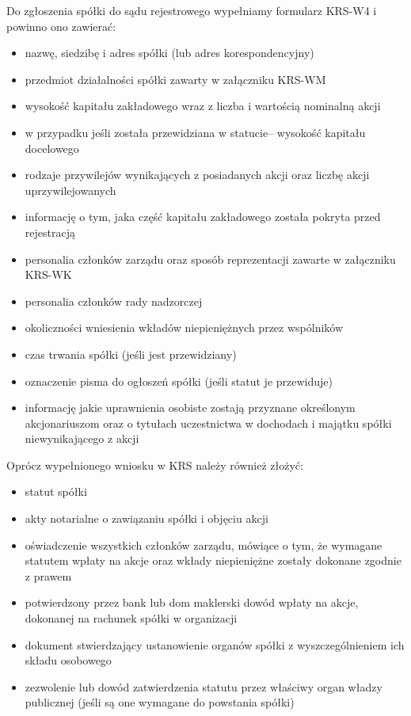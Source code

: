 \documentclass[11pt]{article}
\begin{document}
Do zgłoszenia spółki do sądu rejestrowego wypełniamy formularz KRS-W4 i powinno ono zawierać:
	\begin{itemize}
	
	\item nazwę, siedzibę i adres spółki (lub adres korespondencyjny)
	\item przedmiot działalności spółki zawarty w załączniku KRS-WM
	\item wysokość kapitału zakładowego wraz z liczba i wartością nominalną akcji
	\item w przypadku jeśli została przewidziana w statucie– wysokość kapitału docelowego
	\item rodzaje przywilejów wynikających z posiadanych akcji oraz liczbę akcji uprzywilejowanych
	\item informację o tym, jaka część kapitału zakładowego została pokryta przed rejestracją 
	\item personalia członków zarządu oraz sposób reprezentacji zawarte w załączniku KRS-WK
	\item personalia członków rady nadzorczej
	\item okoliczności wniesienia wkładów niepieniężnych przez wspólników
	\item czas trwania spółki (jeśli jest przewidziany)
	\item oznaczenie pisma do ogłoszeń spółki (jeśli statut je przewiduje)
	\item informację jakie uprawnienia osobiste zostają przyznane określonym akcjonariuszom oraz o tytułach uczestnictwa w dochodach i majątku spółki niewynikającego z akcji

	\end{itemize}
	
	Oprócz wypełnionego wniosku w KRS należy również złożyć:
	
	\begin{itemize}
	
	\item statut spółki
	\item akty notarialne o zawiązaniu spółki i objęciu akcji
	\item oświadczenie wszystkich członków zarządu, mówiące o tym, że wymagane statutem wpłaty na akcje oraz wkłady niepieniężne zostały dokonane zgodnie z prawem
	\item potwierdzony przez bank lub dom maklerski dowód wpłaty na akcje, dokonanej na rachunek spółki w organizacji
	\item dokument stwierdzający ustanowienie organów spółki z wyszczególnieniem ich składu osobowego
	\item zezwolenie lub dowód zatwierdzenia statutu przez właściwy organ władzy publicznej (jeśli są one wymagane do powstania spółki)

	\end{itemize}
	
\end{document}
